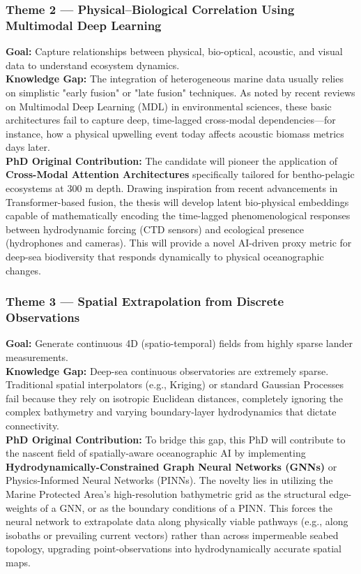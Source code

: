 \documentclass[12pt,a4paper]{article}
\begin{document}
\subsubsection{Theme 2 — Physical–Biological Correlation Using Multimodal Deep Learning}
\textbf{Goal:} Capture relationships between physical, bio-optical, acoustic, and visual data to understand ecosystem dynamics.\\
\textbf{Knowledge Gap:} The integration of heterogeneous marine data usually relies on simplistic "early fusion" or "late fusion" techniques. As noted by recent reviews on Multimodal Deep Learning (MDL) in environmental sciences, these basic architectures fail to capture deep, time-lagged cross-modal dependencies—for instance, how a physical upwelling event today affects acoustic biomass metrics days later.\\
\textbf{PhD Original Contribution:} The candidate will pioneer the application of \textbf{Cross-Modal Attention Architectures} specifically tailored for bentho-pelagic ecosystems at 300 m depth. Drawing inspiration from recent advancements in Transformer-based fusion, the thesis will develop latent bio-physical embeddings capable of mathematically encoding the time-lagged phenomenological responses between hydrodynamic forcing (CTD sensors) and ecological presence (hydrophones and cameras). This will provide a novel AI-driven proxy metric for deep-sea biodiversity that responds dynamically to physical oceanographic changes.

\subsubsection{Theme 3 — Spatial Extrapolation from Discrete Observations}
\textbf{Goal:} Generate continuous 4D (spatio-temporal) fields from highly sparse lander measurements.\\
\textbf{Knowledge Gap:} Deep-sea continuous observatories are extremely sparse. Traditional spatial interpolators (e.g., Kriging) or standard Gaussian Processes fail because they rely on isotropic Euclidean distances, completely ignoring the complex bathymetry and varying boundary-layer hydrodynamics that dictate connectivity.\\
\textbf{PhD Original Contribution:} To bridge this gap, this PhD will contribute to the nascent field of spatially-aware oceanographic AI by implementing \textbf{Hydrodynamically-Constrained Graph Neural Networks (GNNs)} or Physics-Informed Neural Networks (PINNs). The novelty lies in utilizing the Marine Protected Area's high-resolution bathymetric grid as the structural edge-weights of a GNN, or as the boundary conditions of a PINN. This forces the neural network to extrapolate data along physically viable pathways (e.g., along isobaths or prevailing current vectors) rather than across impermeable seabed topology, upgrading point-observations into hydrodynamically accurate spatial maps.
\end{document}
